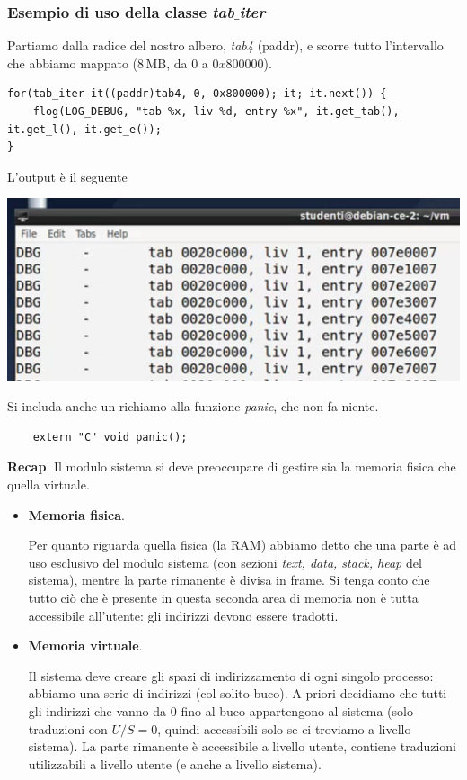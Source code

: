 \documentclass[11pt]{report}
\theoremstyle{definition}
\begin{document}
\subsubsection{Esempio di uso della classe \emph{tab$\_$iter}} 
Partiamo dalla radice del nostro albero, \emph{tab4} (paddr), e scorre tutto l'intervallo che abbiamo mappato ($8\,\text{MB}$, da $0$ a $0x800000$).
\begin{verbatim}
for(tab_iter it((paddr)tab4, 0, 0x800000); it; it.next()) {
    flog(LOG_DEBUG, "tab %x, liv %d, entry %x", it.get_tab(), it.get_l(), it.get_e());
}
\end{verbatim}
L'output è il seguente
\begin{center}
	\includegraphics[scale=.85]{img/244.PNG}
\end{center} 
Si includa anche un richiamo alla funzione \emph{panic}, che non fa niente.
\begin{verbatim}
	extern "C" void panic();
\end{verbatim}

\normalsize 

\begin{framed}
\noindent \textbf{Recap}. Il modulo sistema si deve preoccupare di gestire sia la memoria fisica che quella virtuale.
\begin{itemize}
	\item \textbf{Memoria fisica}.
	
	Per quanto riguarda quella fisica (la RAM) abbiamo detto che una parte è ad uso esclusivo del modulo sistema (con sezioni \textit{text, data, stack, heap} del sistema), mentre la parte rimanente è divisa in frame. Si tenga conto che tutto ciò che è presente in questa seconda area di memoria non è tutta accessibile all'utente: gli indirizzi devono essere tradotti.
	\item \textbf{Memoria virtuale}.
	
	Il sistema deve creare gli spazi di indirizzamento di ogni singolo processo: abbiamo una serie di indirizzi (col solito buco). A priori decidiamo che tutti gli indirizzi che vanno da $0$ fino al buco appartengono al sistema (solo traduzioni con $U/S=0$, quindi accessibili solo se ci troviamo a livello sistema). La parte rimanente è accessibile a livello utente, contiene traduzioni utilizzabili a livello utente (e anche a livello sistema).
\end{itemize}
\end{framed}
\end{document}

